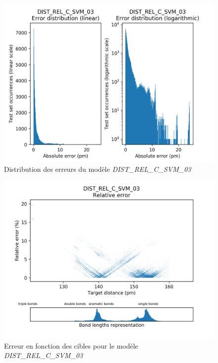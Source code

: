 \begin{figure}[!h]
	\centering
	
	\includegraphics[scale=0.8]{../figures/DIST_REL_C_SVM_03/DIST_REL_C_SVM_03_distrib_rmse_val.png}	
	
	\caption{Distribution des erreurs du modèle \emph{DIST\_REL\_C\_SVM\_03}}
\end{figure}
\begin{figure}[!h]
	\centering
	
	\includegraphics[scale=0.8]{../figures/DIST_REL_C_SVM_03/DIST_REL_C_SVM_03_distrib_rmse_dist.png}	
	
	\caption{Erreur en fonction des cibles pour le modèle \emph{DIST\_REL\_C\_SVM\_03}}
	\end{figure}

